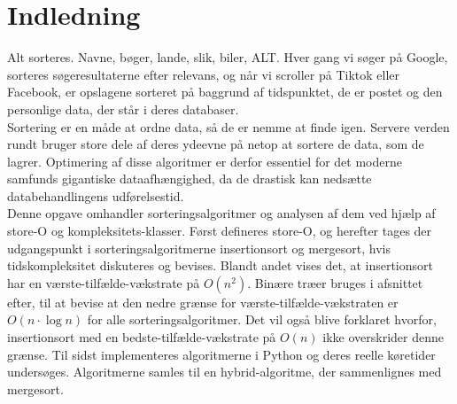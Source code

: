 \chapter*{Indledning}
\label{ch:Indledning}

Alt sorteres. Navne, bøger, lande, slik, biler, ALT. Hver gang vi søger på Google, sorteres søgeresultaterne efter relevans, og når vi scroller på Tiktok eller Facebook, er opslagene sorteret på baggrund af tidspunktet, de er postet og den personlige data, der står i deres databaser.\\

Sortering er en måde at ordne data, så de er nemme at finde igen. Servere verden rundt bruger store dele af deres ydeevne på netop at sortere de data, som de lagrer. Optimering af disse algoritmer er derfor essentiel for det moderne samfunds gigantiske dataafhængighed, da de drastisk kan nedsætte databehandlingens udførelsestid.\\

Denne opgave omhandler sorteringsalgoritmer og analysen af dem ved hjælp af store-O og kompleksitets-klasser. Først defineres store-O, og herefter tages der udgangspunkt i sorteringsalgoritmerne insertionsort og mergesort, hvis tidskompleksitet diskuteres og bevises. Blandt andet vises det, at insertionsort har en værste-tilfælde-vækstrate på $O(n^2)$. Binære træer bruges i afsnittet efter, til at bevise at den nedre grænse for værste-tilfælde-vækstraten er $O(n \cdot \log n)$ for alle sorteringsalgoritmer. Det vil også blive forklaret hvorfor, insertionsort med en bedste-tilfælde-vækstrate på $O(n)$ ikke overskrider denne grænse. Til sidst implementeres algoritmerne i Python og deres reelle køretider undersøges. Algoritmerne samles til en hybrid-algoritme, der sammenlignes med mergesort.
